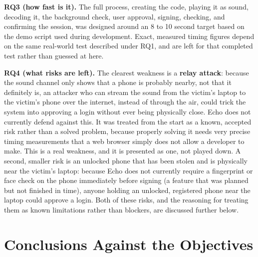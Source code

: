 \textbf{RQ3 (how fast is it).} The full process, creating the code,
playing it as sound, decoding it, the background check, user approval,
signing, checking, and confirming the session, was designed around an
8 to 10 second target based on the demo script used during development.
Exact, measured timing figures depend on the same real-world test
described under RQ1, and are left for that completed test rather than
guessed at here.

\textbf{RQ4 (what risks are left).} The clearest weakness is a
\textbf{relay attack}: because the sound channel only shows that a phone
is probably nearby, not that it definitely is, an attacker who can stream
the sound from the victim's laptop to the victim's phone over the
internet, instead of through the air, could trick the system into
approving a login without ever being physically close. Echo does not
currently defend against this. It was treated from the start as a known,
accepted risk rather than a solved problem, because properly solving it
needs very precise timing measurements that a web browser simply does not
allow a developer to make. This is a real weakness, and it is presented
as one, not played down. A second, smaller risk is an unlocked phone that
has been stolen and is physically near the victim's laptop: because Echo
does not currently require a fingerprint or face check on the phone
immediately before signing (a feature that was planned but not finished
in time), anyone holding an unlocked, registered phone near the laptop
could approve a login. Both of these risks, and the reasoning for treating
them as known limitations rather than blockers, are discussed further
below.

\section{Conclusions Against the Objectives}

